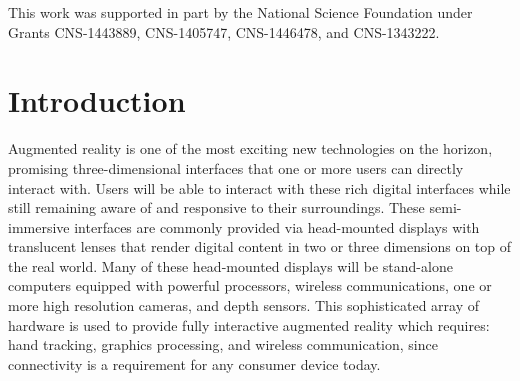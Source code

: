 \documentclass[12pt]{report}
\begin{document}
\vfill

This work was supported in part by the National Science Foundation under Grants 
CNS-1443889, CNS-1405747, CNS-1446478, and CNS-1343222.

\pagebreak




\tableofcontents
\pagebreak

\listoffigures
\pagebreak

\listoftables
\pagebreak

\pagestyle{myheadings}


\chapter{Introduction}
Augmented reality is one of the most exciting new technologies on the horizon, promising three-dimensional interfaces that one or more users can directly interact with. Users will be able to interact with these rich digital interfaces while still remaining aware of and responsive to their surroundings. These semi-immersive interfaces are commonly provided via head-mounted displays with translucent lenses that render digital content in two or three dimensions on top of the real world. Many of these head-mounted displays will be stand-alone computers equipped with powerful processors, wireless communications, one or more high resolution cameras, and depth sensors. This sophisticated array of hardware is used to provide fully interactive augmented reality which requires: hand tracking, graphics processing, and wireless communication, since connectivity is a requirement for any consumer device today. \par
\end{document}
